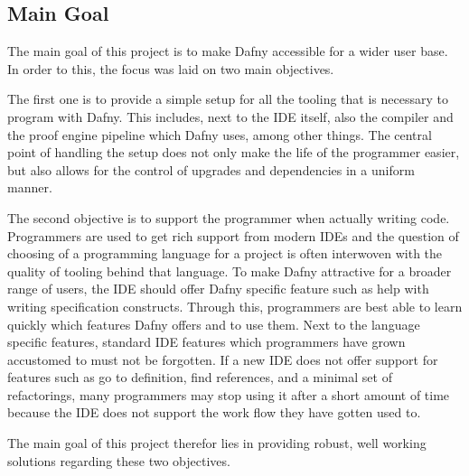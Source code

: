 \subsection{Main Goal}

The main goal of this project is to make Dafny accessible for a wider user base. In order to this, the focus was laid on two main objectives. \newline

The first one is to provide a simple setup for all the tooling that is necessary to program with Dafny. This includes, next to the IDE itself, also the compiler and the proof engine pipeline which Dafny uses, among other things. The central point of handling the setup does not only make the life of the programmer easier, but also allows for the control of upgrades and dependencies in a uniform manner. \newline

The second objective is to support the programmer when actually writing code. Programmers are used to get rich support from modern IDEs and the question of choosing of a programming language for a project is often interwoven with the quality of tooling behind that language. To make Dafny attractive for a broader range of users, the IDE should offer Dafny specific feature such as help with writing specification constructs. Through this, programmers are best able to learn quickly which features Dafny offers and to use them. Next to the language specific features, standard IDE features which programmers have grown accustomed to must not be forgotten. If a new IDE does not offer support for features such as go to definition, find references, and a minimal set of refactorings, many programmers may stop using it after a short amount of time because the IDE does not support the work flow they have gotten used to. \newline

The main goal of this project therefor lies in providing robust, well working solutions regarding these two objectives. \newline